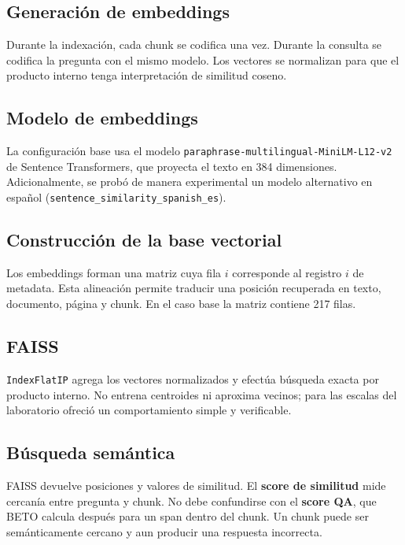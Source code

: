 \documentclass[12pt,letterpaper]{article}
\begin{document}
\subsection{Generación de embeddings}

Durante la indexación, cada chunk se codifica una vez. Durante la consulta se
codifica la pregunta con el mismo modelo. Los vectores se normalizan para que
el producto interno tenga interpretación de similitud coseno.

\subsection{Modelo de embeddings}

La configuración base usa el modelo \texttt{paraphrase-multilingual-MiniLM-L12-v2} de Sentence Transformers, que proyecta el texto en 384 dimensiones. Adicionalmente, se probó de manera experimental un modelo alternativo en español (\texttt{sentence\_similarity\_spanish\_es}).

\subsection{Construcción de la base vectorial}

Los embeddings forman una matriz cuya fila $i$ corresponde al registro $i$ de
metadata. Esta alineación permite traducir una posición recuperada en texto,
documento, página y chunk. En el caso base la matriz contiene 217 filas.

\subsection{FAISS}

\texttt{IndexFlatIP} agrega los vectores normalizados y efectúa búsqueda
exacta por producto interno. No entrena centroides ni aproxima vecinos; para
las escalas del laboratorio ofreció un comportamiento simple y verificable.

\subsection{Búsqueda semántica}

FAISS devuelve posiciones y valores de similitud. El
\textbf{score de similitud} mide cercanía entre pregunta y chunk. No debe
confundirse con el \textbf{score QA}, que BETO calcula después para un span
dentro del chunk. Un chunk puede ser semánticamente cercano y aun producir una
respuesta incorrecta.
\end{document}
